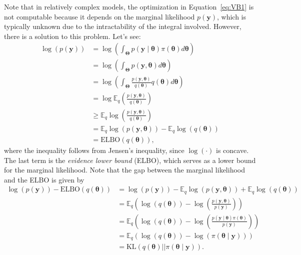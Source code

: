 Note that in relatively complex models, the optimization in Equation~\ref{eq:VB1} is not computable because it depends on the marginal likelihood $p(\boldsymbol{y})$, which is typically unknown due to the intractability of the integral involved. However, there is a solution to this problem. Let’s see:
\begin{align*}
	\log(p(\boldsymbol{y}))&=\log\left(\int_{\boldsymbol{\Theta}}p(\boldsymbol{y}\mid \boldsymbol{\theta})\pi(\boldsymbol{\theta})d\boldsymbol{\theta}\right)\\
	&=\log\left(\int_{\boldsymbol{\Theta}}p(\boldsymbol{y}, \boldsymbol{\theta})d\boldsymbol{\theta}\right)\\
	&=\log\left(\int_{\boldsymbol{\Theta}}\frac{p(\boldsymbol{y}, \boldsymbol{\theta})}{q(\boldsymbol{\theta})}q(\boldsymbol{\theta})d\boldsymbol{\theta}\right)\\
	&=\log \mathbb{E}_q\left(\frac{p(\boldsymbol{y}, \boldsymbol{\theta})}{q(\boldsymbol{\theta})}\right)\\
	&\geq \mathbb{E}_q\log\left(\frac{p(\boldsymbol{y}, \boldsymbol{\theta})}{q(\boldsymbol{\theta})}\right)\\
	&=\mathbb{E}_q\log(p(\boldsymbol{y}, \boldsymbol{\theta}))-\mathbb{E}_q\log(q(\boldsymbol{\theta}))\\
	&=\text{ELBO}(q(\boldsymbol{\theta})),
\end{align*}
where the inequality follows from Jensen's inequality, since $\log(\cdot)$ is concave. The last term is the \textit{evidence lower bound} (ELBO), which serves as a lower bound for the marginal likelihood. Note that the gap between the marginal likelihood and the ELBO is given by
\begin{align*}
	\log(p(\boldsymbol{y})) - \text{ELBO}(q(\boldsymbol{\theta})) & = \log(p(\boldsymbol{y})) - \mathbb{E}_q\log(p(\boldsymbol{y}, \boldsymbol{\theta}))+\mathbb{E}_q\log(q(\boldsymbol{\theta}))\\
	&=\mathbb{E}_q\left(\log(q(\boldsymbol{\theta}))-\log\left(\frac{p(\boldsymbol{y}, \boldsymbol{\theta})}{p(\boldsymbol{y})}\right)\right)\\
	&=\mathbb{E}_q\left(\log(q(\boldsymbol{\theta}))-\log\left(\frac{p(\boldsymbol{y}\mid \boldsymbol{\theta})\pi( \boldsymbol{\theta})}{p(\boldsymbol{y})}\right)\right)\\
	&=\mathbb{E}_q\left(\log(q(\boldsymbol{\theta}))-\log(\pi(\boldsymbol{\theta}\mid \boldsymbol{y}))\right)\\
	&=\text{KL}(q(\boldsymbol{\theta})||\pi(\boldsymbol{\theta} \mid \mathbf{y})).	 
\end{align*}
